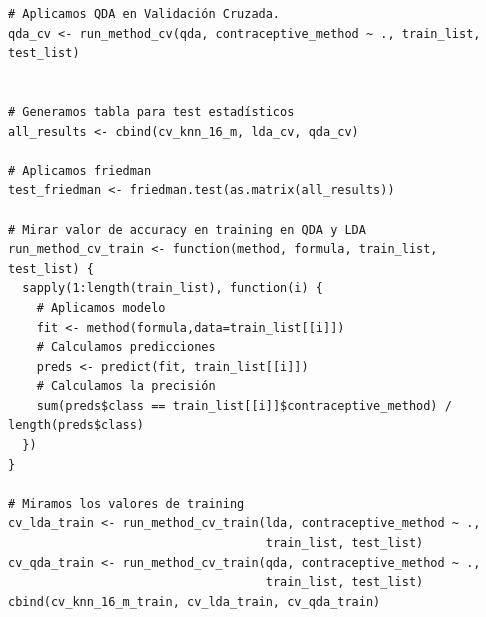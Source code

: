 \documentclass[a4paper,12pt, oneside]{book}
\begin{document}
\begin{verbatim}
# Aplicamos QDA en Validación Cruzada.
qda_cv <- run_method_cv(qda, contraceptive_method ~ ., train_list, test_list)


# Generamos tabla para test estadísticos
all_results <- cbind(cv_knn_16_m, lda_cv, qda_cv)

# Aplicamos friedman
test_friedman <- friedman.test(as.matrix(all_results))

# Mirar valor de accuracy en training en QDA y LDA
run_method_cv_train <- function(method, formula, train_list, test_list) {
  sapply(1:length(train_list), function(i) {
    # Aplicamos modelo
    fit <- method(formula,data=train_list[[i]])
    # Calculamos predicciones
    preds <- predict(fit, train_list[[i]])
    # Calculamos la precisión
    sum(preds$class == train_list[[i]]$contraceptive_method) / length(preds$class)
  })
}
  
# Miramos los valores de training
cv_lda_train <- run_method_cv_train(lda, contraceptive_method ~ ., 
	                                train_list, test_list)
cv_qda_train <- run_method_cv_train(qda, contraceptive_method ~ ., 
	                                train_list, test_list)
cbind(cv_knn_16_m_train, cv_lda_train, cv_qda_train)

\end{verbatim}
\end{document}
